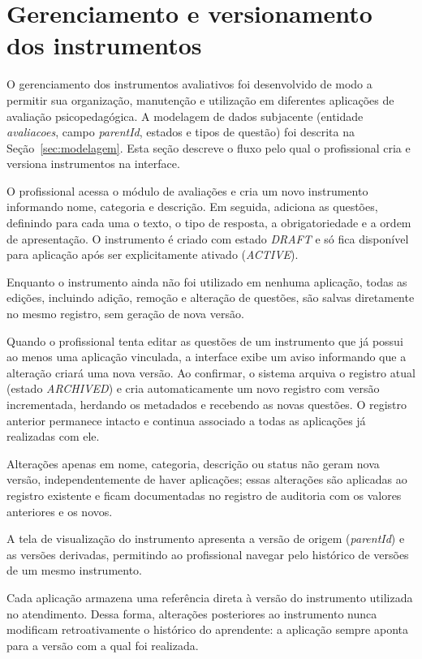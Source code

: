 \section{Gerenciamento e versionamento dos instrumentos}\label{sec:instrumentos}

O gerenciamento dos instrumentos avaliativos foi desenvolvido de modo a permitir sua organização, manutenção e utilização em diferentes aplicações de avaliação psicopedagógica. A modelagem de dados subjacente (entidade \textit{avaliacoes}, campo \textit{parentId}, estados e tipos de questão) foi descrita na Seção~\ref{sec:modelagem}. Esta seção descreve o fluxo pelo qual o profissional cria e versiona instrumentos na interface.

O profissional acessa o módulo de avaliações e cria um novo instrumento informando nome, categoria e descrição. Em seguida, adiciona as questões, definindo para cada uma o texto, o tipo de resposta, a obrigatoriedade e a ordem de apresentação. O instrumento é criado com estado \textit{DRAFT} e só fica disponível para aplicação após ser explicitamente ativado (\textit{ACTIVE}).

Enquanto o instrumento ainda não foi utilizado em nenhuma aplicação, todas as edições, incluindo adição, remoção e alteração de questões, são salvas diretamente no mesmo registro, sem geração de nova versão.

Quando o profissional tenta editar as questões de um instrumento que já possui ao menos uma aplicação vinculada, a interface exibe um aviso informando que a alteração criará uma nova versão. Ao confirmar, o sistema arquiva o registro atual (estado \textit{ARCHIVED}) e cria automaticamente um novo registro com versão incrementada, herdando os metadados e recebendo as novas questões. O registro anterior permanece intacto e continua associado a todas as aplicações já realizadas com ele.

Alterações apenas em nome, categoria, descrição ou status não geram nova versão, independentemente de haver aplicações; essas alterações são aplicadas ao registro existente e ficam documentadas no registro de auditoria com os valores anteriores e os novos.

A tela de visualização do instrumento apresenta a versão de origem (\textit{parentId}) e as versões derivadas, permitindo ao profissional navegar pelo histórico de versões de um mesmo instrumento.

Cada aplicação armazena uma referência direta à versão do instrumento utilizada no atendimento. Dessa forma, alterações posteriores ao instrumento nunca modificam retroativamente o histórico do aprendente: a aplicação sempre aponta para a versão com a qual foi realizada.


